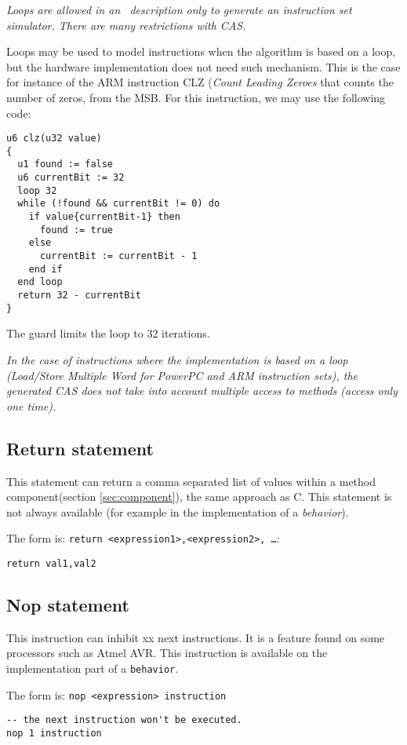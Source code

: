 \emph{Loops are allowed in an \harmless\ description only to generate an instruction set simulator. There are many restrictions with CAS.}

Loops may be used to model instructions when the algorithm is based on a loop, but the hardware implementation does not need such mechanism. This is the case for instance of the ARM instruction CLZ (\emph{Count Leading Zeroes} that counts the number of zeros, from the MSB. For this instruction, we may use the following code:
\begin{lstlisting}
u6 clz(u32 value)
{
  u1 found := false
  u6 currentBit := 32
  loop 32 
  while (!found && currentBit != 0) do
    if value{currentBit-1} then 
      found := true
    else
      currentBit := currentBit - 1
    end if
  end loop
  return 32 - currentBit
}
\end{lstlisting}
The guard limits the loop to 32 iterations.

\emph{In the case of instructions where the implementation is based on a loop (\emph{Load/Store Multiple Word} for PowerPC and ARM instruction sets), the generated CAS does not take into account multiple access to methods (access only one time).}

\subsection{Return statement}
This statement can return a comma separated list of values within a method component(section \ref{sec:component}), the same approach as C. This statement is not always available (for example in the implementation of a \emph{behavior}).

The form is: \texttt{return <expression1>,<expression2>, \ldots}:
\begin{lstlisting}
return val1,val2
\end{lstlisting}

\subsection{Nop statement}
This instruction can inhibit xx next instructions. It is a feature found on some processors such as Atmel AVR. This instruction is available on the implementation part of a  \texttt{behavior}.

The form is: \texttt{nop <expression> instruction}
\begin{lstlisting}
-- the next instruction won't be executed.
nop 1 instruction
\end{lstlisting}

